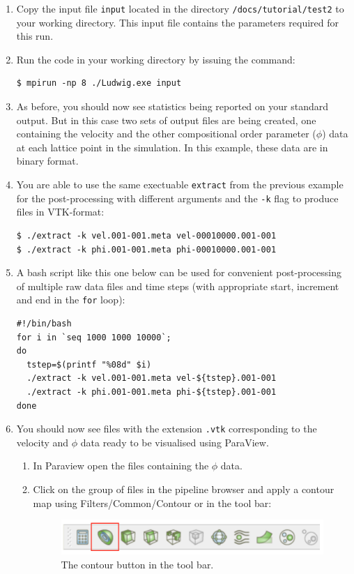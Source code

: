 \documentclass[11pt,twoside,a4paper]{article}
\begin{document}
\begin{enumerate}
\item Copy the input file \texttt{input} located in the directory 
\texttt{/docs/tutorial/test2} 
to your working directory. This input file contains the parameters required for this run. 
\item Run the code in your working directory by issuing the command:
\begin{lstlisting}
$ mpirun -np 8 ./Ludwig.exe input
\end{lstlisting}
\item As before, you should now see statistics being reported on your standard output. But 
in this case two sets of output files are being created, one containing the velocity and 
the other compositional order parameter ($\phi$) data at each lattice point in the simulation. 
In this example, these data are in binary format.
\item You are able to use the same exectuable \texttt{extract} from the previous 
example for the  post-processing with different arguments and the \texttt{-k} flag to produce
files in VTK-format:
\begin{lstlisting}
$ ./extract -k vel.001-001.meta vel-00010000.001-001
$ ./extract -k phi.001-001.meta phi-00010000.001-001
\end{lstlisting}
\item A bash script like this one below can be used for convenient post-processing of multiple 
raw data files and time steps (with appropriate start, increment and end in the \texttt{for} loop):
\begin{lstlisting}
#!/bin/bash
for i in `seq 1000 1000 10000`;
do
  tstep=$(printf "%08d" $i)
  ./extract -k vel.001-001.meta vel-${tstep}.001-001  
  ./extract -k phi.001-001.meta phi-${tstep}.001-001
done
\end{lstlisting}
\item You should now see files with the extension \texttt{.vtk} corresponding to the velocity 
and $\phi$ data ready to be visualised using ParaView.
\begin{enumerate}
\item In Paraview open the files containing the $\phi$ data.
\item Click on the group of files in the pipeline browser and apply a contour map using 
Filters/Common/Contour or in the tool bar: 

\begin{figure}[H]
\begin{center}
\includegraphics[width=0.8\linewidth]{contour.png}
  \caption{The contour button in the tool bar.}
  \label{fig:contour}
  \end{center}
\end{figure}


\end{enumerate}
\end{enumerate}
\end{document}
